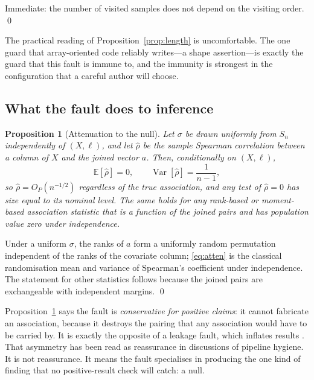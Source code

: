 \documentclass[a4paper,fleqn]{cas-sc}
\newtheorem{proposition}{Proposition}
\begin{document}
\begin{pf}
Immediate: the number of visited samples does not depend on the visiting order.
\qed
\end{pf}

The practical reading of Proposition~\ref{prop:length} is uncomfortable. The one
guard that array-oriented code reliably writes---a shape assertion---is exactly
the guard that this fault is immune to, and the immunity is strongest in the
configuration that a careful author will choose.

\subsection{What the fault does to inference}

\begin{proposition}[Attenuation to the null]
\label{prop:attenuation}
Let $\sigma$ be drawn uniformly from $S_n$ independently of $(X,\ell)$, and let
$\hat\rho$ be the sample Spearman correlation between a column of $X$ and the
joined vector $a$. Then, conditionally on $(X,\ell)$,
\begin{equation}
\mathbb{E}[\hat\rho] = 0, \qquad
\operatorname{Var}[\hat\rho] = \frac{1}{n-1},
\label{eq:atten}
\end{equation}
so $\hat\rho = O_P(n^{-1/2})$ regardless of the true association, and any test of
$\hat\rho = 0$ has size equal to its nominal level. The same holds for any
rank-based or moment-based association statistic that is a function of the
joined pairs and has population value zero under independence.
\end{proposition}

\begin{pf}
Under a uniform $\sigma$, the ranks of $a$ form a uniformly random permutation
independent of the ranks of the covariate column; \eqref{eq:atten} is the classical
randomisation mean and variance of Spearman's coefficient under independence. The
statement for other statistics follows because the joined pairs are exchangeable
with independent margins. \qed
\end{pf}

Proposition~\ref{prop:attenuation} says the fault is \emph{conservative for
positive claims}: it cannot fabricate an association, because it destroys the
pairing that any association would have to be carried by. It is exactly the
opposite of a leakage fault, which inflates results \citep{kapoor2023}. That
asymmetry has been read as reassurance in discussions of pipeline hygiene. It is
not reassurance. It means the fault specialises in producing the one kind of
finding that no positive-result check will catch: a null.
\end{document}
